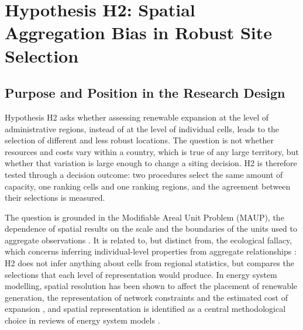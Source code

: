 
\section{Hypothesis H2: Spatial Aggregation Bias in Robust Site Selection}
\label{sec:h2}

\subsection{Purpose and Position in the Research Design}
\label{subsec:h2_purpose}

Hypothesis H2 asks whether assessing renewable expansion at the level of
administrative regions, instead of at the level of individual cells, leads to
the selection of different and less robust locations. The question is not
whether resources and costs vary within a country, which is true of any large
territory, but whether that variation is large enough to change a siting
decision. H2 is therefore tested through a decision outcome: two procedures
select the same amount of capacity, one ranking cells and one ranking regions,
and the agreement between their selections is measured.

The question is grounded in the Modifiable Areal Unit Problem (MAUP), the
dependence of spatial results on the scale and the boundaries of the units used
to aggregate observations \cite{openshaw1984,gotwayyoung2002}. It is related to,
but distinct from, the ecological fallacy, which concerns inferring
individual-level properties from aggregate relationships \cite{robinson1950}:
H2 does not infer anything about cells from regional statistics, but compares
the selections that each level of representation would produce. In energy
system modelling, spatial resolution has been shown to affect the placement of
renewable generation, the representation of network constraints and the
estimated cost of expansion \cite{hoerschbrown2017,frysztacki2021,trondle2020},
and spatial representation is identified as a central methodological choice in
reviews of energy system models \cite{pfenninger2014,javanmardi2025}.

